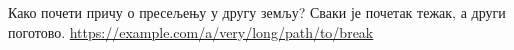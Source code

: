 \documentclass{article}
\begin{document}
Како почети причу о пресељењу у другу земљу? Сваки је почетак тежак,
а други поготово. \url{https://example.com/a/very/long/path/to/break}
\end{document}
